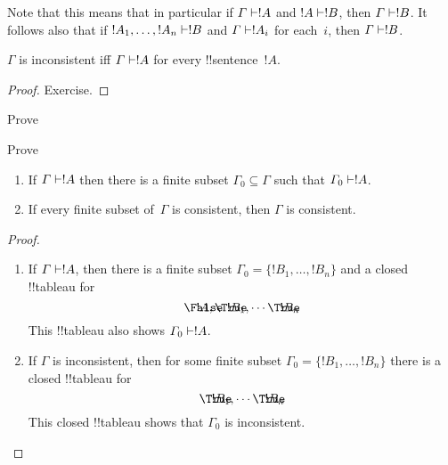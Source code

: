 \documentclass[../../../include/open-logic-section]{subfiles}
\begin{document}
Note that this means that in particular if $\Gamma \Proves !A$ and $!A
\Proves !B$, then $\Gamma \Proves !B$. It follows also that if $!A_1,
\dots, !A_n \Proves !B$ and $\Gamma \Proves !A_i$ for each~$i$, then
$\Gamma \Proves !B$.

\begin{prop}
$\Gamma$ is inconsistent iff $\Gamma \Proves !A$ for every
  !!{sentence}~$!A$.
\end{prop}

\begin{proof}
Exercise.
\end{proof}

\begin{prob}
Prove 
\end{prob}
\tagendprob

\begin{prob}
Prove 
\end{prob}
\tagendprob

\begin{prop}[Compactness]
  \begin{enumerate}
  \item If $\Gamma \Proves !A$ then there is a finite subset $\Gamma_0
    \subseteq \Gamma$ such that $\Gamma_0 \Proves !A$.
  \item If every finite subset of~$\Gamma$ is
    consistent, then $\Gamma$ is consistent.
  \end{enumerate}
\end{prop}

\begin{proof}
  \begin{enumerate}
    \item If $\Gamma \Proves !A$, then there is a finite subset
      $\Gamma_0 = \{!B_1, \dots, !B_n\}$ and a closed !!{tableau} for
      \[
      \sFmla{\False}{!A}, \sFmla{\True}{!B_1}, \dotsm \sFmla{\True}{!B_n}
      \]
      This !!{tableau} also shows $\Gamma_0 \Proves !A$.
    \item If $\Gamma$ is inconsistent, then for some finite subset
      $\Gamma_0 = \{!B_1, \dots, !B_n\}$ there is a closed !!{tableau}
      for
      \[
      \sFmla{\True}{!B_1}, \dotsm \sFmla{\True}{!B_n}
      \]
      This closed !!{tableau} shows that $\Gamma_0$ is inconsistent.
  \end{enumerate}
\end{proof}
\end{document}
